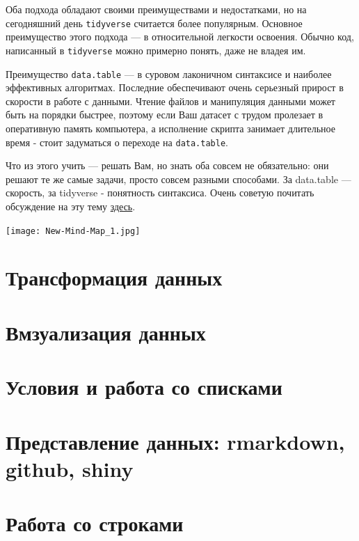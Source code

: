 \documentclass[]{book}
\begin{document}
Оба подхода обладают своими преимуществами и недостатками, но на сегодняшний день \texttt{tidyverse} считается более популярным. Основное преимущество этого подхода --- в относительной легкости освоения. Обычно код, написанный в \texttt{tidyverse} можно примерно понять, даже не владея им.

Преимущество \texttt{data.table} --- в суровом лаконичном синтаксисе и наиболее эффективных алгоритмах. Последние обеспечивают очень серьезный прирост в скорости в работе с данными. Чтение файлов и манипуляция данными может быть на порядки быстрее, поэтому если Ваш датасет с трудом пролезает в оперативную память компьютера, а исполнение скрипта занимает длительное время - стоит задуматься о переходе на \texttt{data.table}.

Что из этого учить --- решать Вам, но знать оба совсем не обязательно: они решают те же самые задачи, просто совсем разными способами. За data.table --- скорость, за tidyverse - понятность синтаксиса. Очень советую почитать обсуждение на эту тему \href{https://stackoverflow.com/questions/21435339/data-table-vs-dplyr-can-one-do-something-well-the-other-cant-or-does-poorly}{здесь}.

\texttt{[image: New-Mind-Map\_1.jpg]}

\hypertarget{tidy_dplyr}{%
\chapter{Трансформация данных}\label{tidy_dplyr}}

\hypertarget{viz_1}{%
\chapter{Вмзуализация данных}\label{viz_1}}

\hypertarget{dplyr_purr}{%
\chapter{Условия и работа со списками}\label{dplyr_purr}}

\hypertarget{data_presentation}{%
\chapter{Представление данных: rmarkdown, github, shiny}\label{data_presentation}}

\hypertarget{strings}{%
\chapter{Работа со строками}\label{strings}}
\end{document}
